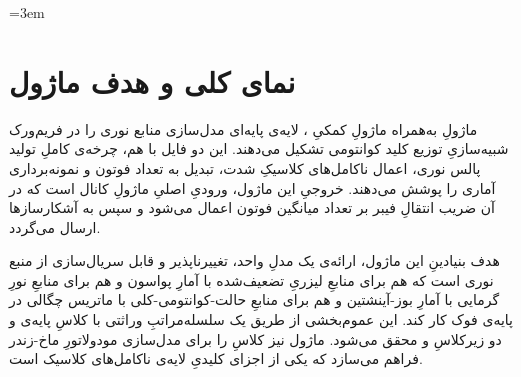 
\sloppy
\emergencystretch=3em


\section{نمای کلی و هدف ماژول}
\label{sec:sources-overview}

ماژولِ  به‌همراه ماژولِ کمکیِ ، لایه‌ی پایه‌ای مدل‌سازی منابع نوری را در فریم‌ورک شبیه‌سازیِ توزیع کلید کوانتومی  تشکیل می‌دهند. این دو فایل با هم، چرخه‌ی کاملِ تولید پالس نوری، اعمال ناکامل‌های کلاسیکِ شدت، تبدیل به تعداد فوتون و نمونه‌برداری آماری را پوشش می‌دهند. خروجیِ این ماژول، ورودیِ اصلیِ ماژولِ کانال  است که در آن ضریب انتقالِ فیبر بر تعداد میانگین فوتون اعمال می‌شود و سپس به آشکارسازها ارسال می‌گردد.

هدف بنیادینِ این ماژول، ارائه‌ی یک مدلِ واحد، تغییرناپذیر  و قابل سریال‌سازی از منبع نوری است که هم برای منابعِ لیزریِ تضعیف‌شده با آمارِ پواسون و هم برای منابعِ نورِ گرمایی با آمارِ بوز-آینشتین و هم برای منابعِ حالت-کوانتومی-کلی با ماتریس چگالی در پایه‌ی فوک کار کند. این عموم‌بخشی از طریق یک سلسله‌مراتبِ وراثتی با کلاسِ پایه‌ی  و دو زیرکلاسِ  و  محقق می‌شود. ماژول  نیز کلاسِ  را برای مدل‌سازی مودولاتورِ ماخ-زندر  فراهم می‌سازد که یکی از اجزای کلیدیِ لایه‌ی ناکامل‌های کلاسیک است.

